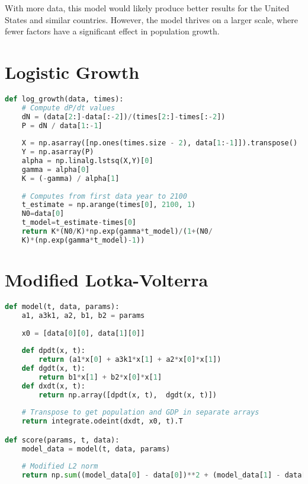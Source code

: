 \documentclass[a4paper]{article}
\begin{document}
With more data, this model would likely produce better results for the United States and similar countries. However, the model thrives on a larger scale, where fewer factors have a significant effect in population growth.

\newpage

\begin{appendices}

\section{Logistic Growth}

\begin{lstlisting}[language=Python]
def log_growth(data, times):
    # Compute dP/dt values
    dN = (data[2:]-data[:-2])/(times[2:]-times[:-2])
    P = dN / data[1:-1]
    
    X = np.asarray([np.ones(times.size - 2), data[1:-1]]).transpose()
    Y = np.asarray(P)
    alpha = np.linalg.lstsq(X,Y)[0]
    gamma = alpha[0]
    K = (-gamma) / alpha[1]
   
    # Computes from first data year to 2100
    t_estimate = np.arange(times[0], 2100, 1)
    N0=data[0]
    t_model=t_estimate-times[0]
    return K*(N0/K)*np.exp(gamma*t_model)/(1+(N0/
    K)*(np.exp(gamma*t_model)-1))
\end{lstlisting}

\section{Modified Lotka-Volterra}

\begin{lstlisting}[language=Python]
def model(t, data, params):   
    a1, a3k1, a2, b1, b2 = params
    
    x0 = [data[0][0], data[1][0]]
    
    def dpdt(x, t):
        return (a1*x[0] + a3k1*x[1] + a2*x[0]*x[1])
    def dgdt(x, t):
        return b1*x[1] + b2*x[0]*x[1]
    def dxdt(x, t):
        return np.array([dpdt(x, t),  dgdt(x, t)])
    
    # Transpose to get population and GDP in separate arrays
    return integrate.odeint(dxdt, x0, t).T 

def score(params, t, data):
    model_data = model(t, data, params)
    
    # Modified L2 norm
    return np.sum((model_data[0] - data[0])**2 + (model_data[1] - data[1])**2) 
\end{lstlisting}

\end{appendices}

\newpage

\nocite{*}


\end{document}
